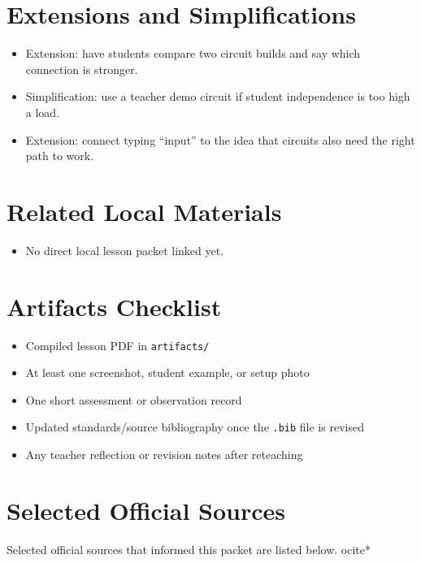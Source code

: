 \documentclass[11pt]{article}
\begin{document}
\section*{Extensions and Simplifications}
\begin{itemize}[leftmargin=*]
\item Extension: have students compare two circuit builds and say which connection is stronger.
\item Simplification: use a teacher demo circuit if student independence is too high a load.
\item Extension: connect typing “input” to the idea that circuits also need the right path to work.
\end{itemize}

\section*{Related Local Materials}
\begin{itemize}[leftmargin=*]
\item No direct local lesson packet linked yet.
\end{itemize}

\section*{Artifacts Checklist}
\begin{itemize}[leftmargin=*]
\item Compiled lesson PDF in \texttt{artifacts/}
\item At least one screenshot, student example, or setup photo
\item One short assessment or observation record
\item Updated standards/source bibliography once the \texttt{.bib} file is revised
\item Any teacher reflection or revision notes after reteaching
\end{itemize}

\section*{Selected Official Sources}
Selected official sources that informed this packet are listed below.
ocite{*}



\end{document}

